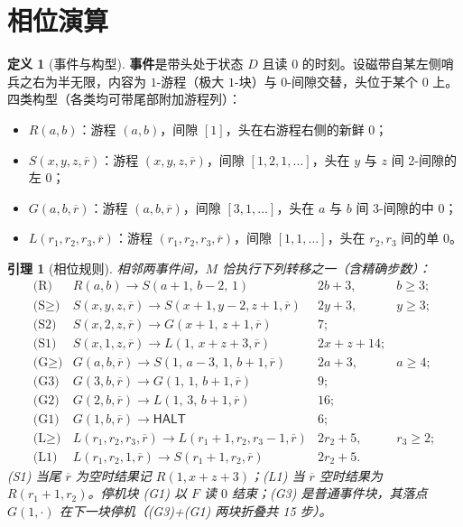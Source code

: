 \documentclass[11pt]{ctexart}
\newtheorem{lemma}[theorem]{引理}
\theoremstyle{definition}
\newtheorem{definition}[theorem]{定义}
\newcommand{\HALT}{\textsf{HALT}}
\begin{document}
\section{相位演算}\label{sec:phase}

\begin{definition}[事件与构型]\label{def:phase}
\textbf{事件}是带头处于状态 $D$ 且读 $0$ 的时刻。设磁带自某左侧哨兵之右为半无限，内容为 $1$-游程（极大 $1$-块）与 $0$-间隙交替，头位于某个 $0$ 上。四类构型（各类均可带尾部附加游程列）：
\begin{itemize}
\item $R(a,b)$：游程 $(a,b)$，间隙 $[1]$，头在右游程右侧的新鲜 $0$；
\item $S(x,y,z,\overline r)$：游程 $(x,y,z,\overline r)$，间隙 $[1,2,1,\dots]$，头在 $y$ 与 $z$ 间 2-间隙的左 $0$；
\item $G(a,b,\overline r)$：游程 $(a,b,\overline r)$，间隙 $[3,1,\dots]$，头在 $a$ 与 $b$ 间 3-间隙的中 $0$；
\item $L(r_1,r_2,r_3,\overline r)$：游程 $(r_1,r_2,r_3,\overline r)$，间隙 $[1,1,\dots]$，头在 $r_2,r_3$ 间的单 $0$。
\end{itemize}
\end{definition}

\begin{lemma}[相位规则]\label{lem:rules}
相邻两事件间，$M$ 恰执行下列转移之一（含精确步数）：
{\small
\[
\begin{array}{llll}
\text{(R)} & R(a,b)\to S(a{+}1,\,b{-}2,\,1) & 2b{+}3, & b\ge3;\\
\text{(S$\ge$)} & S(x,y,z,\overline r)\to S(x{+}1,y{-}2,z{+}1,\overline r) & 2y{+}3, & y\ge3;\\
\text{(S2)} & S(x,2,z,\overline r)\to G(x{+}1,\,z{+}1,\overline r) & 7;\\
\text{(S1)} & S(x,1,z,\overline r)\to L(1,\,x{+}z{+}3,\overline r) & 2x{+}z{+}14;\\
\text{(G$\ge$)} & G(a,b,\overline r)\to S(1,\,a{-}3,\,1,\,b{+}1,\overline r) & 2a{+}3, & a\ge4;\\
\text{(G3)} & G(3,b,\overline r)\to G(1,\,1,\,b{+}1,\overline r) & 9;\\
\text{(G2)} & G(2,b,\overline r)\to L(1,\,3,\,b{+}1,\overline r) & 16;\\
\text{(G1)} & G(1,b,\overline r)\to\HALT & 6;\\
\text{(L$\ge$)} & L(r_1,r_2,r_3,\overline r)\to L(r_1{+}1,r_2,r_3{-}1,\overline r) & 2r_2{+}5, & r_3\ge2;\\
\text{(L1)} & L(r_1,r_2,1,\overline r)\to S(r_1{+}1,r_2,\overline r) & 2r_2{+}5.
\end{array}
\]
}
(S1) 当尾 $\overline r$ 为空时结果记 $R(1,x{+}z{+}3)$；(L1) 当 $\overline r$ 空时结果为 $R(r_1{+}1,r_2)$。停机块 (G1) 以 $F$ 读 $0$ 结束；(G3) 是普通事件块，其落点 $G(1,\cdot)$ 在下一块停机（(G3)+(G1) 两块折叠共 15 步）。
\end{lemma}
\end{document}
